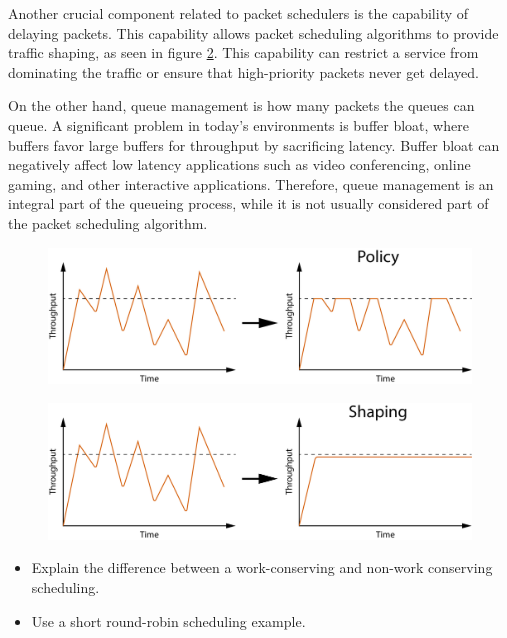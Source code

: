 \documentclass[sigconf, nonacm]{acmart}
\begin{document}
Another crucial component related to packet schedulers is the capability of delaying packets. This capability allows packet scheduling algorithms to provide traffic shaping, as seen in figure \ref{fig:traffic_shaping}. This capability can restrict a service from dominating the traffic or ensure that high-priority packets never get delayed.

On the other hand, queue management is how many packets the queues can queue. A significant problem in today's environments is buffer bloat, where buffers favor large buffers for throughput by sacrificing latency. Buffer bloat can negatively affect low latency applications such as video conferencing, online gaming, and other interactive applications. Therefore, queue management is an integral part of the queueing process, while it is not usually considered part of the packet scheduling algorithm.

\begin{figure}
  \includegraphics[width=\linewidth]{traffic-policy.pdf}
  \caption{\label{fig:traffic_policy}}
\end{figure}

\begin{figure}
  \includegraphics[width=\linewidth]{traffic-shaping.pdf}
  \caption{\label{fig:traffic_shaping}}
\end{figure}


\begin{itemize}
  \item Explain the difference between a work-conserving and non-work conserving scheduling.
  \item Use a short round-robin scheduling example.
\end{itemize}
\end{document}
